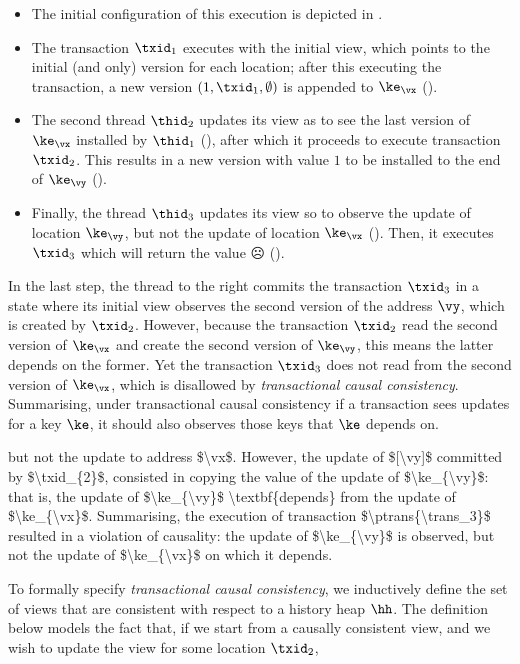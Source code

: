 \begin{itemize}
\item The initial configuration of this execution is depicted in .
\item The transaction $\txid_{1}$ executes with the initial view, which points to the initial (and only) version for each location; after this executing the transaction, a new version $( 1, \txid_1, \emptyset )$ is appended to \( \ke_\vx\) ().
\item The second thread $\thid_2$ updates its view as to see the last version of $\ke_\vx$ installed by $\thid_1$ (), after which it proceeds to execute transaction $\txid_{2}$. 
This results in a new version with value $1$ to be installed to the end of $\ke_\vy$ (). 
\item Finally, the thread $\thid_3$ updates its view so to observe the update of location $\ke_{\vy}$, but not the update of 
location $\ke_{\vx}$ ().
Then, it executes $\txid_{3}$ which will return the value ${\sadface{}}$ ().
\end{itemize}

In the last step, the thread to the right commits the transaction $\txid_3$ in a state where its initial view observes the second version of the address $\vy$, which is created by \( \txid_{2} \).
However, because the transaction \( \txid_{2} \) read the second version of \( \ke_\vx \) and create the second version of \( \ke_\vy \), this means the latter depends on the former.
Yet the transaction \( \txid_{3} \) does not read from the second version of \( \ke_\vx \), which is disallowed by \emph{transactional causal consistency}.
Summarising, under transactional causal consistency if a transaction sees updates for a key \( \ke \), it should also observes those keys that \( \ke \) depends on.

\ac{
but not the update to address $\vx$.
However, the update of $[\vy]$ committed by $\txid_{2}$, consisted in copying the value of the update 
of $\ke_{\vy}$: that is, the update of $\ke_{\vy}$ \textbf{depends} from the update of $\ke_{\vx}$. 
Summarising, the execution of transaction $\ptrans{\trans_3}$ resulted in a violation of 
causality: the update of $\ke_{\vy}$ is observed, but not the update of $\ke_{\vx}$ on which 
it depends.
}

To formally specify \emph{transactional causal consistency}, we inductively define the set of views that are consistent with respect to a history heap $\hh$. 
The definition below models the fact that, if we start from a causally consistent view, and we wish to update the view for some location $\txid_2$, 


